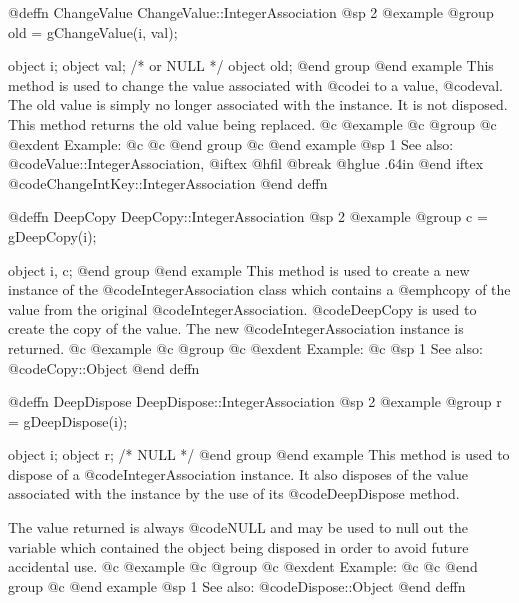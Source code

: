 @deffn {ChangeValue} ChangeValue::IntegerAssociation
@sp 2
@example
@group
old = gChangeValue(i, val);

object  i;
object  val;    /*  or NULL   */
object  old;
@end group
@end example
This method is used to change the value associated with
@code{i} to a value, @code{val}.  The old
value is simply no longer associated with the instance.  It is not
disposed.  This method returns the old value being replaced.
@c @example
@c @group
@c @exdent Example:
@c 
@c @end group
@c @end example
@sp 1
See also:  @code{Value::IntegerAssociation,}
@iftex
@hfil @break @hglue .64in      
@end iftex
@code{ChangeIntKey::IntegerAssociation}
@end deffn










@deffn {DeepCopy} DeepCopy::IntegerAssociation
@sp 2
@example
@group
c = gDeepCopy(i);

object  i, c;
@end group
@end example
This method is used to create a new instance of the
@code{IntegerAssociation} class which contains a @emph{copy} of the value
from the original @code{IntegerAssociation}.  @code{DeepCopy} is used to
create the copy of the value.  The new @code{IntegerAssociation} instance
is returned.
@c @example
@c @group
@c @exdent Example:
@c 
@sp 1
See also:  @code{Copy::Object}
@end deffn













@deffn {DeepDispose} DeepDispose::IntegerAssociation
@sp 2
@example
@group
r = gDeepDispose(i);

object  i;
object  r;     /*  NULL  */
@end group
@end example
This method is used to dispose of a @code{IntegerAssociation} instance.
It also disposes of the value associated with the instance by the
use of its @code{DeepDispose} method.

The value returned is always @code{NULL} and may be used to null out
the variable which contained the object being disposed in order to
avoid future accidental use.
@c @example
@c @group
@c @exdent Example:
@c 
@c @end group
@c @end example
@sp 1
See also:  @code{Dispose::Object}
@end deffn


















